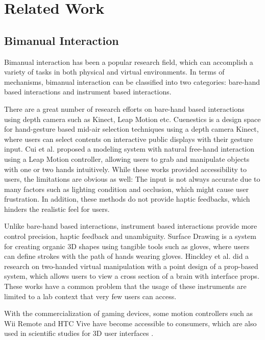 
\section{Related Work}
\label{sec:2}

\subsection{Bimanual Interaction}
\label{sec:2.1}
Bimanual interaction has been a popular research field, which can accomplish a variety of tasks in both physical and virtual environments.
In terms of mechanisms, bimanual interaction can be classified into two categories: bare-hand based interactions and instrument based interactions.

There are a great number of research efforts \cite{walter2014cuenesics,cui2016exploration,ramani2015gesture,murugappan2013handy,han2014virtual} on bare-hand based interactions using depth camera such as Kinect, Leap Motion etc.
Cuenestics \cite{walter2014cuenesics} is a design space for hand-gesture based mid-air selection techniques using a depth camera Kinect, where users can select contents on interactive public displays with their gesture input.
Cui et al. \cite{cui2016exploration} proposed a modeling system with natural free-hand interaction using a Leap Motion controller, allowing users to grab and manipulate objects with one or two hands intuitively.
While these works provided accessibility to users, the limitations are obvious as well: The input is not always accurate due to many factors such as lighting condition and occlusion, which might cause user frustration.
In addition, these methods do not provide haptic feedbacks, which hinders the realistic feel for users.

Unlike bare-hand based interactions, instrument based interactions provide more control precision, haptic feedback and unambiguity.
Surface Drawing \cite{schkolne2001surface} is a system for creating organic 3D shapes using tangible tools such as gloves, where users can define strokes with the path of hands wearing gloves.
Hinckley et al. \cite{hinckley1998two} did a research on two-handed virtual manipulation with a point design of a prop-based system, which allows users to view a cross section of a brain with interface props.
These works have a common problem that the usage of these instruments are limited to a lab context that very few users can access.

With the commercialization of gaming devices, some motion controllers such as Wii Remote and HTC Vive have become accessible to consumers, which are also used in scientific studies for 3D user interfaces \cite{wingcrave2010wii, niehorster2017accuracy}.

